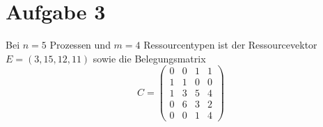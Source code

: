 \documentclass[numbers=noendperiod]{scrartcl}
\begin{document}

\section*{Aufgabe 3}

Bei $n = 5$ Prozessen und $m = 4$ Ressourcentypen ist der Ressourcevektor $E = (3,15,12,11)$ sowie die Belegungsmatrix
\begin{equation}
	C = \begin{pmatrix}
	0 & 0 & 1 & 1\\
	1 & 1 & 0 & 0\\
	1 & 3 & 5 & 4\\
	0 & 6 & 3 & 2\\
	0 & 0 & 1 & 4
	\end{pmatrix}
\end{equation}
\end{document}
